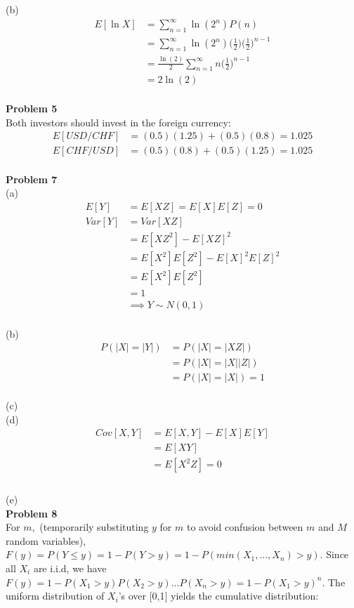 \documentclass[letterpaper,12pt]{article}
\theoremstyle{definition}
\begin{document}
(b) \begin{align*}
E[\ln X] &= \sum_{n=1}^{\infty}\ln(2^n)P(n)\\
&= \sum_{n=1}^{\infty}\ln(2^n)\Big(\frac{1}{2}\Big)\Big(\frac{1}{2}\Big)^{n-1}\\
&= \frac{\ln(2)}{2}\sum_{n=1}^{\infty}n\Big(\frac{1}{2}\Big)^{n-1}\\
&= 2\ln(2)
\end{align*}\newline\\
\noindent\textbf{Problem 5}\\
Both investors should invest in the foreign currency:
\begin{align*}
E[USD / CHF] &= (0.5)(1.25) + (0.5)(0.8) = 1.025\\
E[CHF / USD] &= (0.5)(0.8) + (0.5)(1.25) = 1.025
\end{align*}\newline\\
\noindent\textbf{Problem 7}\\
(a) \begin{align*}
E[Y] &= E[XZ] = E[X]E[Z] = 0\\
Var[Y] &= Var[XZ]\\
&= E[XZ^2] - E[XZ]^2\\
&= E[X^2]E[Z^2] - E[X]^2E[Z]^2\\
&= E[X^2]E[Z^2]\\
&= 1\\
&\implies Y \sim N(0,1)
\end{align*}\\
(b) 
\begin{align*}
P(|X|=|Y|) &= P(|X|=|XZ|)\\
&=P(|X|=|X||Z|)\\
&= P(|X|=|X|) = 1
\end{align*}\\
(c)\\
(d) \begin{align*}
Cov[X,Y] &= E[X,Y]-E[X]E[Y]\\
&= E[XY]\\
&= E[X^2Z] = 0\\
\end{align*}\\
(e)\\
\noindent\textbf{Problem 8}\\
For $m,$ (temporarily substituting $y$ for $m$ to avoid confusion between $m$ and $M$ random variables), $F(y) = P(Y \leq y) = 1-P(Y> y) = 1-P(min(X_1,...,X_n) > y).$ Since all $X_i$ are i.i.d, we have $F(y) = 1-P(X_1 > y)P(X_2>y)...P(X_n>y) = 1 - P(X_1 > y)^n.$ The uniform distribution of $X_i$'s over [0,1] yields the cumulative distribution:
\end{document}
